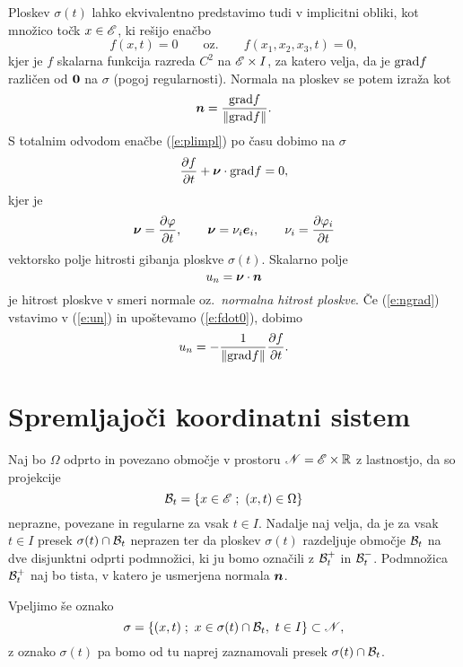 Ploskev $\sigma(t)$ lahko ekvivalentno predstavimo tudi v 
implicitni obliki, kot množico točk $x\in\mathscr E$, ki rešijo enačbo
\begin{equation} \label{e:plimpl}
	f(x,t)=0\qquad\textrm{oz.}\qquad f(x_1,x_2,x_3,t)=0,
\end{equation}
kjer je $f$ skalarna funkcija razreda $C^2$ na $\mathscr E\times I$,
za katero velja, da je $\mathrm{grad} f$ različen od $\boldsymbol 0$ na $\sigma$
(pogoj regularnosti). Normala na ploskev se potem izraža kot
\begin{equation} \label{e:ngrad}
	\boldsymbol n=\frac{\mathrm{grad} f}{\|\mathrm{grad} f\|}.
\end{equation}
S totalnim odvodom enačbe (\ref{e:plimpl}) po času dobimo na $\sigma$
\begin{equation} \label{e:fdot0}
	\frac{\partial f}{\partial t}+\boldsymbol \nu\cdot\mathrm{grad} f = 0,
\end{equation}
kjer je
\begin{equation} \label{e:nu}
	\boldsymbol \nu=\frac{\partial\varphi}{\partial t},\qquad
	\boldsymbol \nu=\nu_i\boldsymbol e_i,\qquad \nu_i=\frac{\partial\varphi_i}{\partial t}
\end{equation}
vektorsko polje hitrosti gibanja ploskve $\sigma(t)$. Skalarno polje
\begin{equation} \label{e:un}
	u_n=\boldsymbol \nu\cdot\boldsymbol n
\end{equation}
je hitrost ploskve v smeri normale oz.~\emph{normalna hitrost ploskve}.
Če (\ref{e:ngrad}) vstavimo v (\ref{e:un}) in upoštevamo (\ref{e:fdot0}), dobimo
\begin{equation} \label{e:nohit}
	u_n=-\frac{1}{\|\mathrm{grad} f\|}\frac{\partial f}{\partial t}.
\end{equation}


\section{Spremljajoči koordinatni sistem} \label{s:sks}


Naj bo $\Omega$ odprto in povezano območje v prostoru $\mathscr N=\mathscr E\times\mathbb R$ z lastnostjo, da so projekcije
\[ \B_t=\{x\in\E\;;\ (x,t)\in\Omega\} \]
neprazne, povezane in regularne za vsak $t\in I$. Nadalje naj velja, da je za vsak $t\in I$
presek $\sigma(t)\cap\mathcal B_t$ neprazen ter da ploskev $\sigma(t)$ razdeljuje območje
$\mathcal B_t$ na dve disjunktni odprti podmnožici, ki ju bomo označili z $\mathcal B_t^+$ in $\mathcal B_t^-$.
Podmnožica $\mathcal B_t^+$ naj bo tista, v katero je usmerjena normala $\boldsymbol n$.

Vpeljimo še oznako
\[
	\sigma=\{(x,t)\;;\ x\in\sigma(t)\cap \B_t,\ t\in I\}\subset\N,
\]
z oznako $\sigma(t)$ pa bomo od tu naprej zaznamovali presek $\sigma(t)\cap\mathcal B_t$.

